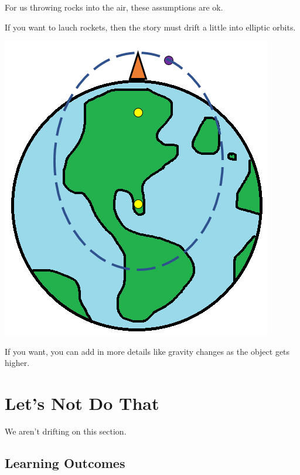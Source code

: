 \documentclass{ximera}
\begin{document}
For us throwing rocks into the air, these assumptions are ok.

If you want to lauch rockets, then the story must drift a little into elliptic orbits.  




\begin{center}
\includegraphics{Earth-Gravity.png}
\end{center}


If you want, you can add in more details like gravity changes as the object gets higher.






\section{Let's Not Do That}


We aren't drifting on this section.















\subsection{Learning Outcomes}
\end{document}
